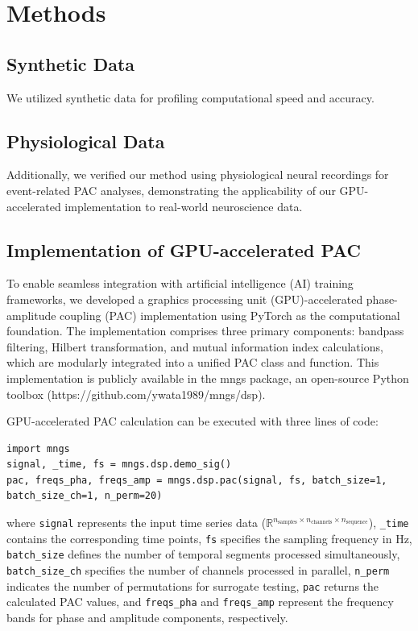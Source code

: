 
\section{Methods}
\subsection{Synthetic Data}
We utilized synthetic data for profiling computational speed and accuracy.

\subsection{Physiological Data}
Additionally, we verified our method using physiological neural recordings for event-related PAC analyses, demonstrating the applicability of our GPU-accelerated implementation to real-world neuroscience data.


\subsection{Implementation of GPU-accelerated PAC}
To enable seamless integration with artificial intelligence (AI) training frameworks, we developed a graphics processing unit (GPU)-accelerated phase-amplitude coupling (PAC) implementation using PyTorch as the computational foundation. The implementation comprises three primary components: bandpass filtering, Hilbert transformation, and mutual information index calculations, which are modularly integrated into a unified PAC class and function. This implementation is publicly available in the mngs package, an open-source Python toolbox (https://github.com/ywata1989/mngs/dsp).

\indent GPU-accelerated PAC calculation can be executed with three lines of code:
\begin{verbatim}
import mngs
signal, _time, fs = mngs.dsp.demo_sig()
pac, freqs_pha, freqs_amp = mngs.dsp.pac(signal, fs, batch_size=1, batch_size_ch=1, n_perm=20)
\end{verbatim}
where \texttt{signal} represents the input time series data ($\mathbb{R}^{n_\text{samples} \times n_\text{channels} \times n_\text{sequence}}$), \texttt{\_time} contains the corresponding time points, \texttt{fs} specifies the sampling frequency in Hz, \texttt{batch\_size} defines the number of temporal segments processed simultaneously, \texttt{batch\_size\_ch} specifies the number of channels processed in parallel, \texttt{n\_perm} indicates the number of permutations for surrogate testing, \texttt{pac} returns the calculated PAC values, and \texttt{freqs\_pha} and \texttt{freqs\_amp} represent the frequency bands for phase and amplitude components, respectively.

